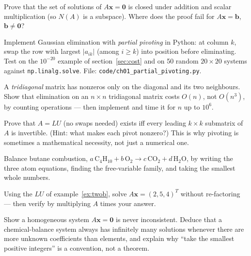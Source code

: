 \begin{exercise}[medium]
Prove that the set of solutions of $A\mathbf{x}=\mathbf{0}$ is closed under addition and scalar multiplication (so $N(A)$ is a subspace). Where does the proof fail for $A\mathbf{x}=\mathbf{b}$, $\mathbf{b}\neq\mathbf{0}$?
\end{exercise}
\begin{exercise}[hard]
Implement Gaussian elimination with \emph{partial pivoting} in Python: at column $k$, swap the row with largest $|a_{ik}|$ (among $i\ge k$) into position before eliminating. Test on the $10^{-20}$ example of section~\ref{sec:cost} and on 50 random $20\times20$ systems against \texttt{np.linalg.solve}. File: \texttt{code/ch01\_partial\_pivoting.py}.
\end{exercise}
\begin{exercise}[hard]
A \emph{tridiagonal} matrix has nonzeros only on the diagonal and its two neighbours. Show that elimination on an $n\times n$ tridiagonal matrix costs $O(n)$, not $O(n^3)$, by counting operations — then implement and time it for $n$ up to $10^6$.
\end{exercise}
\begin{exercise}[hard]
Prove that $A=LU$ (no swaps needed) exists iff every leading $k\times k$ submatrix of $A$ is invertible. (Hint: what makes each pivot nonzero?) This is why pivoting is sometimes a mathematical necessity, not just a numerical one.
\end{exercise}
\begin{exercise}[medium]
Balance butane combustion, $a\,\mathrm{C}_4\mathrm{H}_{10} + b\,\mathrm{O}_2 \to c\,\mathrm{CO}_2 + d\,\mathrm{H}_2\mathrm{O}$, by writing the three atom equations, finding the free-variable family, and taking the smallest whole numbers.
\end{exercise}
\begin{exercise}[medium]
Using the $LU$ of example~\ref{ex:twob}, solve $A\mathbf{x}=(2,5,4)^{T}$ without re-factoring --- then verify by multiplying $A$ times your answer.
\end{exercise}
\begin{exercise}[hard]
Show a homogeneous system $A\mathbf{x}=\mathbf{0}$ is never inconsistent. Deduce that a chemical-balance system always has infinitely many solutions whenever there are more unknown coefficients than elements, and explain why ``take the smallest positive integers'' is a convention, not a theorem.
\end{exercise}
